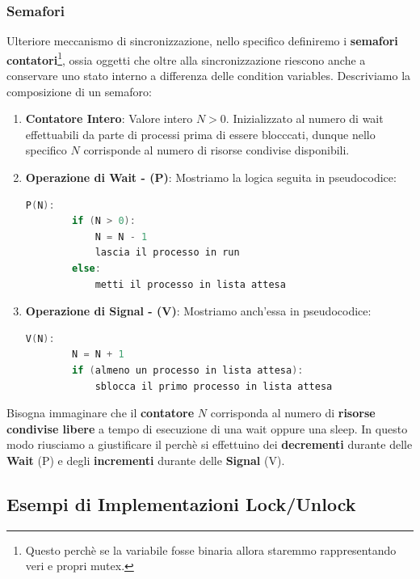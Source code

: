 \documentclass{article}
\begin{document}
\subsubsection{Semafori}

Ulteriore meccanismo di sincronizzazione, nello specifico definiremo i \textbf{semafori contatori}\footnote{Questo perchè se la variabile fosse binaria allora staremmo rappresentando veri e propri mutex.}, ossia oggetti che oltre alla sincronizzazione
riescono anche a conservare uno stato interno a differenza delle condition variables. Descriviamo la composizione di un semaforo:

\begin{enumerate}
    \item \textbf{Contatore Intero}: Valore intero $N > 0$. Inizializzato al numero di wait effettuabili da parte di processi prima di essere blocccati, dunque nello specifico $N$ corrisponde al numero di risorse condivise disponibili.
    \item \textbf{Operazione di Wait - (P)}: Mostriamo la logica seguita in pseudocodice:
    
    \begin{lstlisting}[language = C]
    P(N):
        if (N > 0):
            N = N - 1
            lascia il processo in run
        else:
            metti il processo in lista attesa
    \end{lstlisting}   
    \vspace*{-8px}
    \item \textbf{Operazione di Signal - (V)}: Mostriamo anch'essa in pseudocodice:
    \begin{lstlisting}[language = C]
    V(N):
        N = N + 1
        if (almeno un processo in lista attesa):
            sblocca il primo processo in lista attesa
    \end{lstlisting}
\end{enumerate}
\vspace*{-20px}
Bisogna immaginare che il \textbf{contatore} $N$ corrisponda al numero di \textbf{risorse condivise libere} a tempo di esecuzione di una wait oppure una sleep. In questo
modo riusciamo a giustificare il perchè si effettuino dei \textbf{decrementi} durante delle \textbf{Wait} (P) e degli \textbf{incrementi} durante delle \textbf{Signal} (V).

\newpage

\subsection{Esempi di Implementazioni Lock/Unlock}
\end{document}
